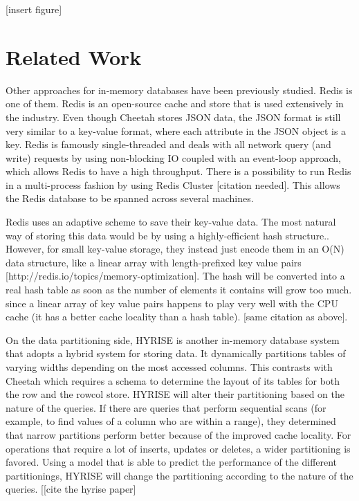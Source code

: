 \documentclass[11pt,journal,compsoc]{IEEEtran}
\begin{document}
[insert figure]


\section{Related Work}
Other approaches for in-memory databases have been previously studied. Redis is one of them. Redis is an open-source cache and store that is used extensively in the industry. Even though Cheetah stores JSON data, the JSON format is still very similar to a key-value format, where each attribute in the JSON object is a key. Redis is famously single-threaded and deals with all network query (and write) requests by using non-blocking IO coupled with an event-loop approach, which allows Redis to have a high throughput. There is a possibility to run Redis in a multi-process fashion by using Redis Cluster [citation needed]. This allows the Redis database to be spanned across several machines.

Redis uses an adaptive scheme to save their key-value data. The most natural way of storing this data would be by using a highly-efficient hash structure.. However, for small key-value storage, they instead just encode them in an O(N) data structure, like a linear array with length-prefixed key value pairs [http://redis.io/topics/memory-optimization]. The hash will be converted into a real hash table as soon as the number of elements it contains will grow too much. since a linear array of key value pairs happens to play very well with the CPU cache (it has a better cache locality than a hash table). [same citation as above].

On the data partitioning side, HYRISE is another in-memory database system that adopts a hybrid system for storing data. It dynamically partitions tables of varying widths depending on the most accessed columns. This contrasts with Cheetah which requires a schema to determine the layout of its tables for both the row and the rowcol store. HYRISE will alter their partitioning based on the nature of the queries. If there are queries that perform sequential scans (for example, to find values of a column who are within a range), they determined that narrow partitions perform better because of the improved cache locality. For operations that require a lot of inserts, updates or deletes, a wider partitioning is favored. Using a model that is able to predict the performance of the different partitionings, HYRISE will change the partitioning according to the nature of the queries. 
[[cite the hyrise paper]
\end{document}
